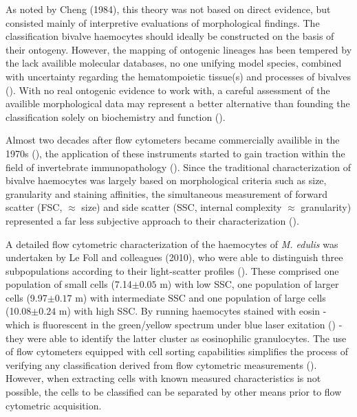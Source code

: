 As noted by Cheng (1984), this theory was not based on direct evidence, but consisted mainly of interpretive evaluations of morphological findings. The classification bivalve haemocytes should ideally be constructed on the basis of their ontogeny. However, the mapping of ontogenic lineages has been tempered by the lack availible molecular databases, no one unifying model species, combined with uncertainty regarding the hematompoietic tissue(s) and processes of bivalves (\cite{Hine1999, Smith2016, Pila2016, delaBallina2022}). With no real ontogenic evidence to work with, a careful assessment of the availible morphological data may represent a better alternative than founding the classification solely on biochemistry and function (\cite{Hine1999}). 

Almost two decades after flow cytometers became commercially availible in the 1970s (\cite{Shapiro2004}), the application of these instruments started to gain traction within the field of invertebrate immunopathology (\cite{Fisher1988}). Since the traditional characterization of bivalve haemocytes was largely based on morphological criteria such as size, granularity and staining affinities, the simultaneous measurement of forward scatter (FSC, $\approx$ size) and side scatter (SSC, internal complexity $\approx$ granularity) represented a far less subjective approach to their characterization (\cite{AshtonAlcox1998, Allam2002, Mateo2009}).

A detailed flow cytometric characterization of the haemocytes of \emph{M. edulis} was undertaken by Le Foll and colleagues (2010), who were able to distinguish three subpopulations according to their light-scatter profiles (\cite{LeFoll2010}). These comprised one population of small cells (7.14$\pm{0.05}$ \micro m) with low SSC, one population of larger cells (9.97$\pm{0.17}$ \micro m) with intermediate SSC and one population of large cells (10.08$\pm{0.24}$ \micro m) with high SSC. By running haemocytes stained with eosin - which is fluorescent in the green/yellow spectrum under blue laser exitation (\cite{Elfer2016, Koegle2020}) - they were able to identify the latter cluster as eosinophilic granulocytes. The use of flow cytometers equipped with cell sorting capabilities simplifies the process of verifying any classification derived from flow cytometric measurements (\cite{Shapiro2004}). However, when extracting cells with known measured characteristics is not possible, the cells to be classified can be separated by other means prior to flow cytometric acquisition.

